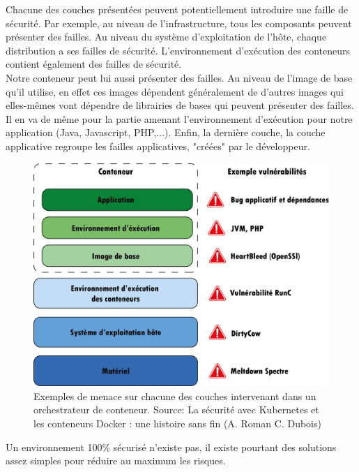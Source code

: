 \documentclass[11pt,fleqn]{book} %
\begin{document}
Chacune des couches présentées peuvent potentiellement introduire une faille de sécurité. Par exemple, au niveau de l'infrastructure, tous les composants peuvent présenter des failles. Au niveau du système d'exploitation de l'hôte, chaque distribution a ses failles de sécurité. L'environnement d'exécution des conteneurs contient également des failles de sécurité.\\

Notre conteneur peut lui aussi présenter des failles. Au niveau de l'image de base qu'il utilise, en effet ces images dépendent généralement de d'autres images qui elles-mêmes vont dépendre de librairies de bases qui peuvent présenter des failles. Il en va de même pour la partie amenant l'environnement d'exécution pour notre application (Java, Javascript, PHP,...). Enfin, la dernière couche, la couche applicative regroupe les failles applicatives, "créées" par le développeur. 

\begin{figure}[H]\centering
\renewcommand{\figurename}{Figure}
\includegraphics[scale=0.6]{Pictures/annexe/container-threat.png}
\captionsetup{margin=1.5cm,format=hang,justification=justified}
\caption[]{Exemples de menace sur chacune des couches intervenant dans un orchestrateur de conteneur. \newline
Source: La sécurité avec Kubernetes et les conteneurs Docker : une histoire sans fin (A. Roman C. Dubois)}
\end{figure}

Un environnement 100\% sécurisé n'existe pas, il existe pourtant des solutions assez simples pour réduire au maximum les risques. 
\end{document}
